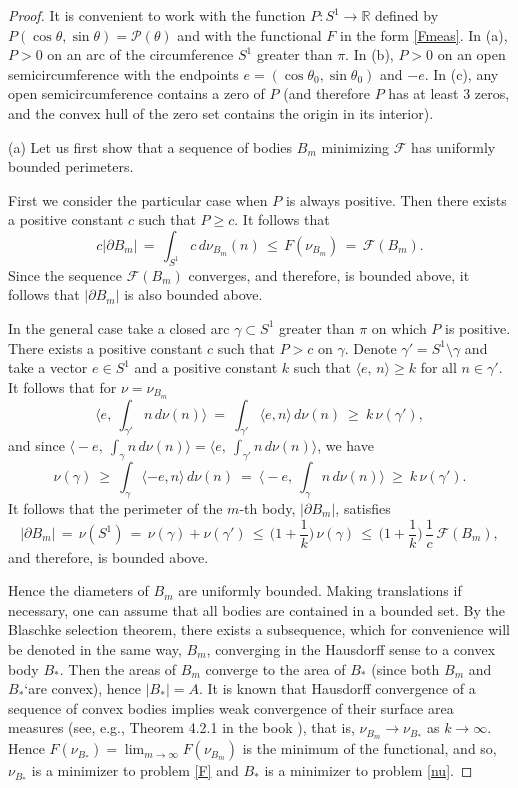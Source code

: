 \documentclass[a4paper,12pt]{article}
\newcommand {\FF}{F}
\newcommand {\FFF}{\mathcal{F}}
\newcommand {\PP}{P}
\newcommand {\PPP}{\mathcal{P}}
\theoremstyle{remark}
\theoremstyle{definition}
\begin{document}
\begin{proof}
It is convenient to work with the function $\PP : S^1 \to \mathbb{R}$ defined by $\PP(\cos\theta,\sin\theta) = \PPP(\theta)$ and with the functional $\FF$ in the form \eqref{Fmeas}. In (a), $\PP > 0$ on an arc of the circumference $S^1$ greater than $\pi$. In (b), $\PP > 0$ on an open semicircumference with the endpoints $e= (\cos\theta_0, \sin\theta_0)$ and $-e$. In (c), any open semicircumference contains a zero of $\PP$ (and therefore $\PP$ has at least 3 zeros, and the convex hull of the zero set contains the origin in its interior).

(a) Let us first show that a sequence of bodies $B_m$ minimizing $\FFF$ has uniformly bounded perimeters.%

First we consider the particular case when $\PP$ is always positive. Then there exists a positive constant $c$ such that $\PP \ge c$. It follows that
$$
c|\partial B_m|\, =\, \int_{S^1} c\, d\nu_{B_m}(n)\, \le\, \FF(\nu_{B_m})\, =\, \FFF(B_m).
$$
Since the sequence $\FFF(B_m)$ converges, and therefore, is bounded above, it follows that $|\partial B_m|$ is also bounded above.

In the general case take a closed arc $\gamma \subset S^1$ greater than $\pi$ on which $\PP$ is positive. There exists a positive constant $c$ such that $\PP>c$ on $\gamma$.
Denote $\gamma' = S^1 \setminus \gamma$ and take a vector $e \in S^1$ and a positive constant $k$ such that $\langle e,\, n \rangle \ge k$ for all $n \in \gamma'$. It follows that for $\nu = \nu_{B_m}$
$$
\Big\langle e,\ \int_{\gamma'} n\, d\nu(n) \Big\rangle\ =\
\int_{\gamma'} \langle e, n \rangle\, d\nu(n)\ \ge\ k\, \nu(\gamma'),
$$
and since $\big\langle -e,\ \int_{\gamma} n\, d\nu(n)\big\rangle = \big\langle e,\ \int_{\gamma'} n\, d\nu(n)\big\rangle$, we have
$$
\nu(\gamma)\ \ge\ \int_{\gamma} \langle -e, n \rangle\, d\nu(n)\ =\
\Big\langle -e,\ \int_{\gamma} n\, d\nu(n) \Big\rangle\ \ge\ k\, \nu(\gamma').
$$
It follows that the perimeter of the $m$-th body, $|\partial B_m|$, satisfies
$$
|\partial B_m|\, =\, \nu(S^1)\, =\, \nu(\gamma) +\nu(\gamma')\, \le \, \Big( 1 + \dfrac{1}{k}\Big)\, \nu(\gamma)\, \le\, \Big( 1 + \dfrac{1}{k}\Big)\,\frac{1}{c}\, \FFF(B_m),
$$
and therefore, is bounded above.

Hence the diameters of $B_m$ are uniformly bounded. Making translations if necessary, one can assume that all bodies are contained in a bounded set. By the Blaschke selection theorem, there exists a subsequence, which for convenience will be denoted in the same way, $B_{m}$, converging in the Hausdorff sense to a convex body $B_*$. Then the areas of $B_{m}$ converge to the area of $B_{*}$ (since both $B_m$ and $B_*$`are convex), hence $|B_{*}|=A.$ It is known that Hausdorff convergence of a sequence of convex bodies implies weak convergence of their surface area measures (see, e.g., Theorem 4.2.1 in the book \cite{S}), that is, $\nu_{B_{m}} \to \nu_{B_*}$ as $k\to\infty$. Hence $\FF(\nu_{B_*}) = \lim_{m\to\infty} \FF(\nu_{B_{m}})$ is the minimum of the functional, and so, $\nu_{B_{*}}$ is a minimizer to problem \eqref{F} and $B_*$ is a minimizer to problem \eqref{nu}.
	\vspace{2mm}
	

\end{proof}
\end{document}
